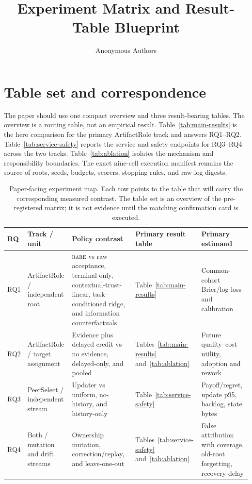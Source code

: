 \documentclass[sigconf,anonymous]{aamas}
\title[Experiment Matrix Blueprint]{Experiment Matrix and Result-Table Blueprint}
\author{Anonymous Authors}
\affiliation{\institution{Internal research draft}}
\newcommand{\rare}{\textsc{rare}}
\begin{document}
\maketitle

\section{Table set and correspondence}

The paper should use one compact overview and three result-bearing tables. The overview is a routing table, not an empirical result. Table~\ref{tab:main-results} is the hero comparison for the primary ArtifactRole track and answers RQ1--RQ2. Table~\ref{tab:service-safety} reports the service and safety endpoints for RQ3--RQ4 across the two tracks. Table~\ref{tab:ablation} isolates the mechanism and responsibility boundaries. The exact nine-cell execution manifest remains the source of roots, seeds, budgets, scorers, stopping rules, and raw-log digests.

\begin{table}[t]
\centering
\small
\setlength{\tabcolsep}{3.5pt}
\renewcommand{\arraystretch}{1.12}
\begin{tabular}{p{}p{}p{}p{}p{}}
\toprule
RQ & Track / unit & Policy contrast & Primary result table & Primary estimand\\
\midrule
RQ1 & ArtifactRole / independent root & \rare{} vs raw acceptance, terminal-only, contextual-trust-linear, task-conditioned ridge, and information counterfactuals & Table~\ref{tab:main-results} & Common-cohort Brier/log loss and calibration\\
RQ2 & ArtifactRole / target assignment & Evidence plus delayed credit vs no evidence, delayed-only, and pooled & Tables~\ref{tab:main-results} and~\ref{tab:ablation} & Future quality--cost utility, adoption and rework\\
RQ3 & PeerSelect / independent stream & Updater vs uniform, no-history, and history-only & Table~\ref{tab:service-safety} & Payoff/regret, update p95, backlog, state bytes\\
RQ4 & Both / mutation and drift streams & Ownership mutation, correction/replay, and leave-one-out & Tables~\ref{tab:service-safety} and~\ref{tab:ablation} & False attribution with coverage, old-root forgetting, recovery delay\\
\bottomrule
\end{tabular}
\caption{Paper-facing experiment map. Each row points to the table that will carry the corresponding measured contrast. The table set is an overview of the pre-registered matrix; it is not evidence until the matching confirmation card is executed.}
\label{tab:overview}
\end{table}
\end{document}
